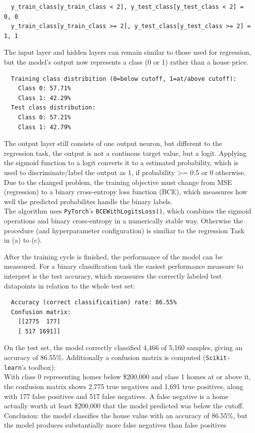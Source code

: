 \documentclass[11pt,a4paper]{article}
\begin{document}
\begin{lstlisting}
  y_train_class[y_train_class < 2], y_test_class[y_test_class < 2] = 0, 0
  y_train_class[y_train_class >= 2], y_test_class[y_test_class >= 2] = 1, 1
\end{lstlisting}

\noindent The input layer and hidden layers can remain similar to those used for regression, 
but the model's output now represents a class (0 or 1) rather than a house price.

\begin{lstlisting}
  Training class distribition (0=below cutoff, 1=at/above cutoff):
    Class 0: 57.71%
    Class 1: 42.29%
  Test class distribution:
    Class 0: 57.21%
    Class 1: 42.79%
\end{lstlisting}

\noindent The output layer still consists of one output neuron, but different to the regression task, the output is not a continous target value, but a logit.
Applying the sigmoid function to a logit converts it to a estimated probability, which is used to discriminate/label the output as 1, if probability >= 0.5 or 0 otherwise.
\\Due to the changed problem, the training objective must change from MSE (regression) to a binary cross-entropy loss function (BCE), which meassures how well the
predicted probabilites handle the binary labels.
\\The algorithm uses \texttt{PyTorch}'s \texttt{BCEWithLogitsLoss()}, which combines the sigmoid operations and binary cross-entropy in a numerically stable way.
Otherwise the procedure (and hyperparameter configuration) is similiar to the regression Task in (a) to (c).

\vspace{1em}
\noindent After the training cycle is finished, the performance of the model can be meassured. For a binary classification task the easiest performance meassure to
interpret is the test accuracy, which meassures the correctly labeled test datapoints in relation to the whole test set:
\begin{lstlisting}
  Accuracy (correct classificaition) rate: 86.55%
  Confusion matrix:
    [[2775  177]
    [ 517 1691]]
\end{lstlisting}

\noindent On the test set, the model correctly classified 4,466 of 5,160 samples, giving an accuracy of 86.55\%. 
Additionally a confusion matrix is computed (\texttt{Scikit-learn}'s toolbox):
\\With class 0 representing homes below \$200,000 and class 1 homes at or above it, the confusion matrix 
shows 2,775 true negatives and 1,691 true positives, along with 177 false positives and 517 false negatives.
A false negative is a home actually worth at least \$200,000 that the model predicted was below the cutoff.
Conclusion: the model classifies the house value with an accuracy of 86.55\%, but the model produces substantially more false negatives than false positives
\end{document}
